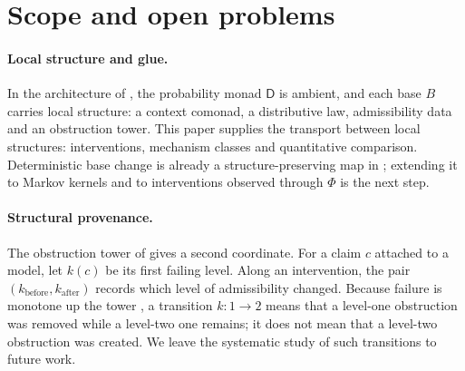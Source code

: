 \documentclass[11pt]{article}
\theoremstyle{definition}
\theoremstyle{remark}
\newcommand{\D}{\mathsf{D}}
\begin{document}
\section{Scope and open problems}\label{sec:scope}

\paragraph{Local structure and glue.} In the architecture of \cite{Awasthi-Tower}, the probability monad
$\D$ is ambient, and each base $B$ carries local structure: a context comonad, a distributive law,
admissibility data and an obstruction tower. This paper supplies the transport between local
structures: interventions, mechanism classes and quantitative comparison. Deterministic base change is
already a structure-preserving map in \cite[Prop.~9.13]{Awasthi-Tower}; extending it to Markov kernels
and to interventions observed through $\Phi$ is the next step.

\paragraph{Structural provenance.} The obstruction tower of \cite[\S10]{Awasthi-Tower} gives a second
coordinate. For a claim $c$ attached to a model, let $k(c)$ be its first failing level. Along an
intervention, the pair $(k_{\mathrm{before}},k_{\mathrm{after}})$ records which level of admissibility
changed. Because failure is monotone up the tower \cite[Thm.~10.5]{Awasthi-Tower}, a transition
$k:1\to2$ means that a level-one obstruction was removed while a level-two one remains; it does not
mean that a level-two obstruction was created. We leave the systematic study of such transitions to
future work.
\end{document}
